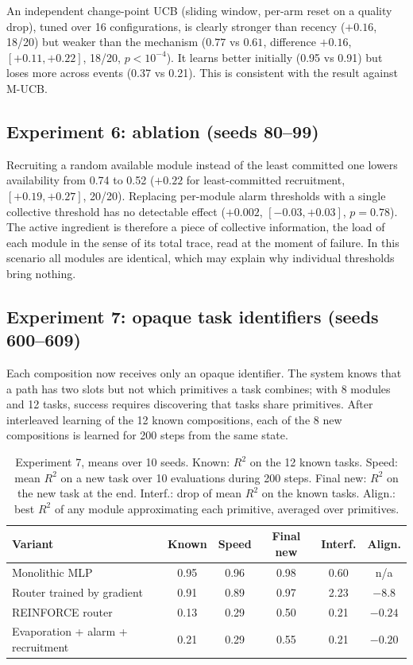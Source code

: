 \documentclass[11pt,a4paper]{article}
\begin{document}
An independent change-point UCB (sliding window, per-arm reset on a quality drop), tuned over 16 configurations, is clearly stronger than recency ($+0.16$, 18/20) but weaker than the mechanism ($0.77$ vs $0.61$, difference $+0.16$, $[+0.11, +0.22]$, 18/20, $p < 10^{-4}$). It learns better initially (0.95 vs 0.91) but loses more across events (0.37 vs 0.21). This is consistent with the result against M-UCB.

\subsection{Experiment 6: ablation (seeds 80--99)}

Recruiting a random available module instead of the least committed one lowers availability from 0.74 to 0.52 ($+0.22$ for least-committed recruitment, $[+0.19, +0.27]$, 20/20). Replacing per-module alarm thresholds with a single collective threshold has no detectable effect ($+0.002$, $[-0.03, +0.03]$, $p = 0.78$). The active ingredient is therefore a piece of collective information, the load of each module in the sense of its total trace, read at the moment of failure. In this scenario all modules are identical, which may explain why individual thresholds bring nothing.

\subsection{Experiment 7: opaque task identifiers (seeds 600--609)}

Each composition now receives only an opaque identifier. The system knows that a path has two slots but not which primitives a task combines; with 8 modules and 12 tasks, success requires discovering that tasks share primitives. After interleaved learning of the 12 known compositions, each of the 8 new compositions is learned for 200 steps from the same state.

\begin{table}[h]
\centering\small\setlength{\tabcolsep}{5pt}
\begin{tabular}{lccccc}
\toprule
Variant & Known & Speed & Final new & Interf. & Align. \\
\midrule
Monolithic MLP & 0.95 & 0.96 & 0.98 & 0.60 & n/a \\
Router trained by gradient & 0.91 & 0.89 & 0.97 & 2.23 & $-8.8$ \\
REINFORCE router & 0.13 & 0.29 & 0.50 & 0.21 & $-0.24$ \\
Evaporation + alarm + recruitment & 0.21 & 0.29 & 0.55 & 0.21 & $-0.20$ \\
\bottomrule
\end{tabular}
\caption{Experiment 7, means over 10 seeds. Known: $R^2$ on the 12 known tasks. Speed: mean $R^2$ on a new task over 10 evaluations during 200 steps. Final new: $R^2$ on the new task at the end. Interf.: drop of mean $R^2$ on the known tasks. Align.: best $R^2$ of any module approximating each primitive, averaged over primitives.}
\label{tab:exp7}
\end{table}
\end{document}
